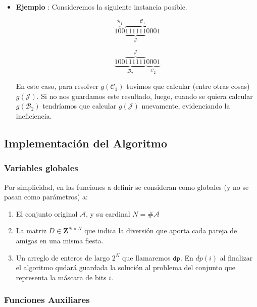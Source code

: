 \begin{itemize}
	\item \textbf{Ejemplo} : Consideremos la siguiente instancia posible.
	
	 $$\overset{\mathcal{B}_1}{\overbrace{100}} \overset{\mathcal{C}_1}{\overbrace{\underset{\mathcal{J}}{\underbrace{111111}}0001}}$$
	
	$$\underset{\mathcal{B}_2}{\underbrace{100\overset{\mathcal{J}}{\overbrace{111111}}}}\underset{\mathcal{C}_2}{\underbrace{0001}}$$
	
	En este caso, para resolver $g(\mathcal{C}_1)$ tuvimos que calcular (entre otras cosas) $g(\mathcal{J})$. Si no nos guardamos este resultado, luego, cuando se quiera calcular $g(\mathcal{B}_2)$ tendríamos que calcular $g(\mathcal{J})$ nuevamente, evidenciando la ineficiencia.
\end{itemize} 

\subsection*{Implementación del Algoritmo}

\subsubsection*{Variables globales}

Por simplicidad, en las funciones a definir se consideran como globales (y no se pasan como parámetros) a:

\begin{enumerate}
	\item El conjunto original $\mathcal{A}$, y su cardinal $N = \# \mathcal{A}$
	\item La matriz $D \in \mathbf{Z}^{N \times N}$ que indica la diversión que aporta cada pareja de amigas en una misma fiesta.
	\item Un arreglo de enteros de largo $2^N$ que llamaremos $\texttt{dp}$. En $dp(i)$ al finalizar el algoritmo qudará guardada la solución al problema del conjunto que representa la máscara de bits $i$.
\end{enumerate}  

\subsubsection*{Funciones Auxiliares}

